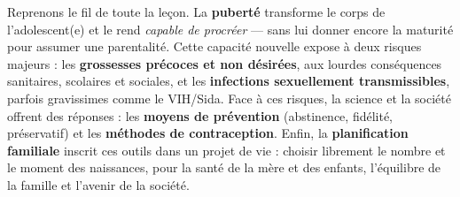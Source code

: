 \documentclass[11pt]{article}
\begin{document}
Reprenons le fil de toute la leçon. La \textbf{puberté} transforme le corps de l'adolescent(e) et le rend \emph{capable de procréer} — sans lui donner encore la maturité pour assumer une parentalité. Cette capacité nouvelle expose à deux risques majeurs : les \textbf{grossesses précoces et non désirées}, aux lourdes conséquences sanitaires, scolaires et sociales, et les \textbf{infections sexuellement transmissibles}, parfois gravissimes comme le VIH/Sida. Face à ces risques, la science et la société offrent des réponses : les \textbf{moyens de prévention} (abstinence, fidélité, préservatif) et les \textbf{méthodes de contraception}. Enfin, la \textbf{planification familiale} inscrit ces outils dans un projet de vie : choisir librement le nombre et le moment des naissances, pour la santé de la mère et des enfants, l'équilibre de la famille et l'avenir de la société.
\end{document}
